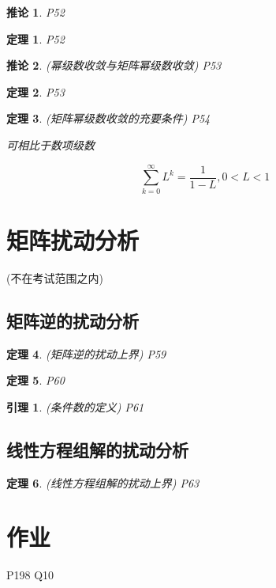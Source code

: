 \documentclass[twoside]{article}
\newtheorem{theorem}{定理}[section]
\newtheorem{lemma}{引理}[section]
\newtheorem{corollary}{推论}[section]
\begin{document}
    \begin{corollary}
      P52
    \end{corollary}

    \begin{theorem}
      P52
    \end{theorem}

    \begin{corollary}
      (幂级数收敛与矩阵幂级数收敛)
      P53
    \end{corollary}

    \begin{theorem}
      P53
    \end{theorem}

    \begin{theorem}
      (矩阵幂级数收敛的充要条件)
      P54

      可相比于数项级数

      \begin{equation*}
          \sum_{k=0}^\infty L^k = \frac{1}{1-L}, 0<L<1
      \end{equation*}

    \end{theorem}


\section{矩阵扰动分析}\label{sec:ju_zhen_rao_dong_fen_xi_}
  (不在考试范围之内)
  \subsection{矩阵逆的扰动分析}
    \begin{theorem}
      (矩阵逆的扰动上界)
      P59
    \end{theorem}

    \begin{theorem}
      P60
    \end{theorem}

    \begin{lemma}
      (条件数的定义)
      P61
    \end{lemma}


  \subsection{线性方程组解的扰动分析}
    \begin{theorem}
      (线性方程组解的扰动上界)
      P63
    \end{theorem}


\section*{作业}\label{sec:zuo_ye_}
  P198 Q10
\end{document}
